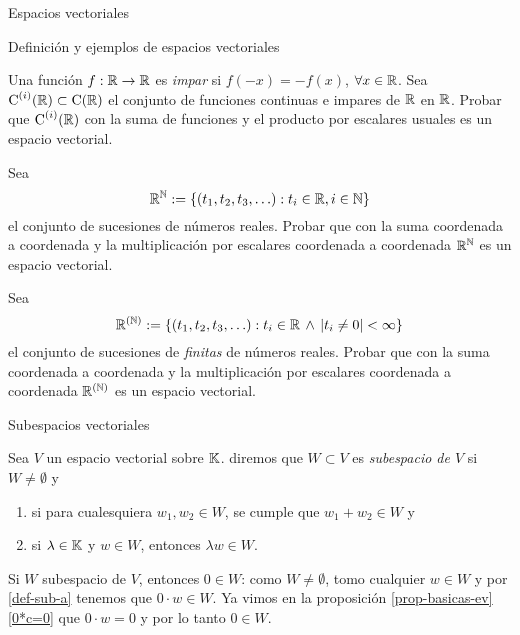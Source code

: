 \begin{chapter}{Espacios vectoriales}
\begin{section}{Definici\'on y ejemplos de espacios vectoriales}
\begin{enumex}
                \item Una función $f:\mathbb R \to \mathbb R$ es \textit{impar} si $f(-x) = -f(x)$, $\forall x \in \mathbb R$. Sea $\operatorname{C}^{(i)}(\mathbb R) \subset \operatorname{C}(\mathbb R)$  el conjunto de funciones continuas e impares de $\mathbb R$ en $\mathbb R$. Probar que  $\operatorname{C}^{(i)}(\mathbb R)$ con la suma de funciones y el producto por escalares usuales es un espacio vectorial. 
                \item\label{ejercicio-r-a-los-nat} Sea 
                $$
                \mathbb R^\mathbb N := \{(t_1,t_2,t_3, \ldots): t_i \in \mathbb R, i \in \mathbb N\}
                $$
                el conjunto de sucesiones de  números reales. Probar que con la suma coordenada a coordenada y la multiplicación por escalares coordenada a coordenada $\mathbb R^\mathbb N$ es un espacio vectorial.
                \item\label{ejercicio-r-a-los-(nat)} Sea 
                $$
                \mathbb R^{(\mathbb N)} := \{(t_1,t_2,t_3, \ldots): t_i \in \mathbb R \,\wedge \, |t_i \ne 0| <\infty\}
                $$
                el conjunto de sucesiones de \textit{finitas} de números reales. Probar que con la suma coordenada a coordenada y la multiplicación por escalares coordenada a coordenada $\mathbb R^{(\mathbb N)}$ es un espacio vectorial. 
            \end{enumex} 
   
\end{section}
    
\begin{section}{Subespacios vectoriales}\label{seccion-subespacios-vectoriales}
    \begin{definicion}
        Sea $V$ un espacio vectorial sobre $\mathbb K$. diremos que $W \subset V$ es \textit{subespacio de $V$} si $W \not= \emptyset$ y
        \begin{enumerate}[label=\textit{\alph*)},ref=\textit{\alph*)}]
            \item\label{def-sub-a} si para cualesquiera $w_1,w_2 \in W$, se cumple que $w_1+w_2 \in W$ y
            \item\label{def-sub-b} si $\lambda \in \mathbb K$ y  $w \in W$, entonces $\lambda w \in W$.
        \end{enumerate}
    \end{definicion}

    \begin{observacion} \label{obs-0-en-subespacio} Si $W$ subespacio de $V$,  entonces $0 \in W$: como  $W \ne \emptyset$, tomo  cualquier $w \in W$ y  por \ref{def-sub-a} tenemos que $0\cdot w \in W$. Ya vimos en la proposición \ref{prop-basicas-ev} \ref{0*c=0}  que $0 \cdot w =0$ y por lo tanto $0 \in W$. 
    \end{observacion}


\end{section}
\end{chapter}
